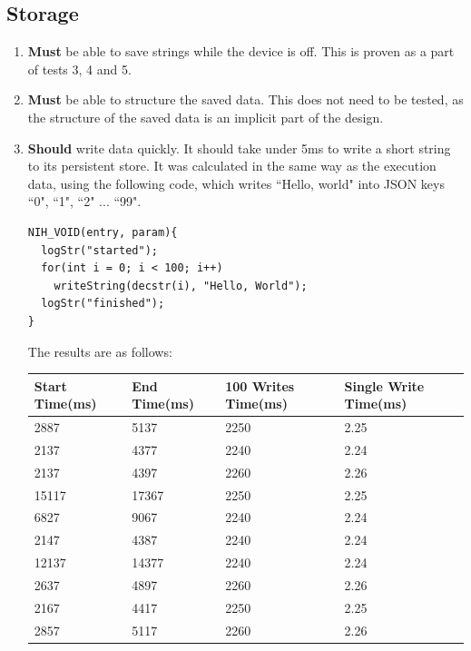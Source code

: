 \documentclass{article}
\begin{document}
\subsection{Storage}
\begin{enumerate}
\item \textbf{Must} be able to save strings while the device is off. This is proven as a part of tests 3, 4 and 5.
\item \textbf{Must} be able to structure the saved data. This does not need to be tested, as the structure of the saved data is an implicit part of the design.
\item \textbf{Should} write data quickly. It should take under 5ms to write a short string to its persistent store. It was calculated in the same way as the execution data, using the following code, which writes ``Hello, world" into JSON keys ``0", ``1", ``2" ... ``99".

\begin{tcolorbox}[colback=white,grow to left by=2.5mm,grow to right by=2.5mm,left*=0mm,right*=0mm,sharp corners]
\begin{verbatim}
NIH_VOID(entry, param){
  logStr("started");
  for(int i = 0; i < 100; i++)
    writeString(decstr(i), "Hello, World");
  logStr("finished");
}
\end{verbatim}
\end{tcolorbox}

The results are as follows:
\begin{table}[H]
\begin{tabular}{|l|l|l|l|}
\hline
Start Time(ms)		&End Time(ms)				&100 Writes Time(ms)		&Single Write Time(ms)		\\ \hline
2887	 & 5137	 & 2250	 & 2.25\\ \hline
2137	 & 4377	 & 2240	 & 2.24\\ \hline
2137	 & 4397	 & 2260	 & 2.26\\ \hline
15117	 & 17367	 & 2250	 & 2.25\\ \hline
6827	 & 9067	 & 2240	 & 2.24\\ \hline
2147	 & 4387	 & 2240	 & 2.24\\ \hline
12137	 & 14377	 & 2240	 & 2.24\\ \hline
2637	 & 4897	 & 2260	 & 2.26\\ \hline
2167	 & 4417	 & 2250	 & 2.25\\ \hline
2857	 & 5117	 & 2260	 & 2.26\\ \hline
\end{tabular}
\end{table}


\end{enumerate}
\end{document}
